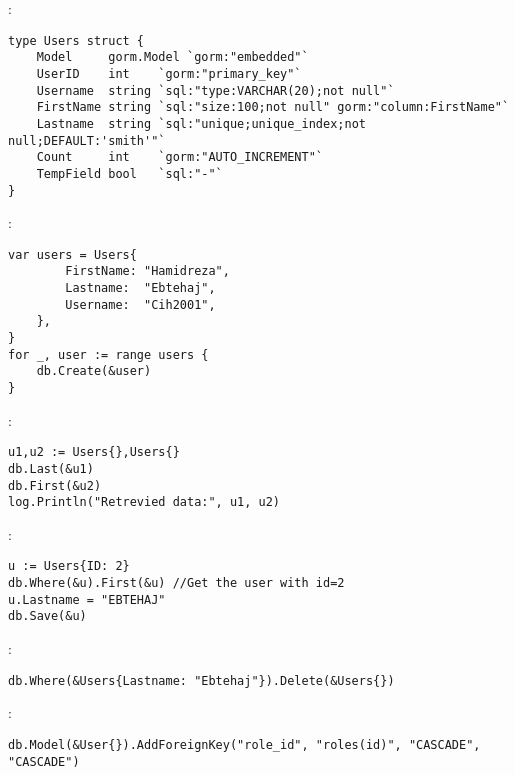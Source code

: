 \begin{note}:
\begin{lstlisting}[language=Golang]
type Users struct {
	Model     gorm.Model `gorm:"embedded"`
	UserID    int    `gorm:"primary_key"`
	Username  string `sql:"type:VARCHAR(20);not null"`
	FirstName string `sql:"size:100;not null" gorm:"column:FirstName"`
	Lastname  string `sql:"unique;unique_index;not null;DEFAULT:'smith'"`
	Count     int    `gorm:"AUTO_INCREMENT"`
	TempField bool   `sql:"-"`
}
\end{lstlisting}
\end{note}
\begin{note}:
\begin{lstlisting}[language=Golang]
var users = Users{
		FirstName: "Hamidreza",
		Lastname:  "Ebtehaj",
		Username:  "Cih2001",
	},
}
for _, user := range users {
	db.Create(&user)
}
\end{lstlisting}
\end{note}
\begin{note}:
\begin{lstlisting}[language=Golang]
u1,u2 := Users{},Users{}
db.Last(&u1)
db.First(&u2)
log.Println("Retrevied data:", u1, u2)
\end{lstlisting}
\end{note}
\begin{note}:
\begin{lstlisting}[language=Golang]
u := Users{ID: 2}
db.Where(&u).First(&u) //Get the user with id=2
u.Lastname = "EBTEHAJ"
db.Save(&u)
\end{lstlisting}
\end{note}
\begin{note}:
\begin{lstlisting}[language=Golang]
db.Where(&Users{Lastname: "Ebtehaj"}).Delete(&Users{})
\end{lstlisting}
\end{note}
\begin{note}:
\begin{lstlisting}[language=Golang]
db.Model(&User{}).AddForeignKey("role_id", "roles(id)", "CASCADE", "CASCADE")
\end{lstlisting}
\end{note}
